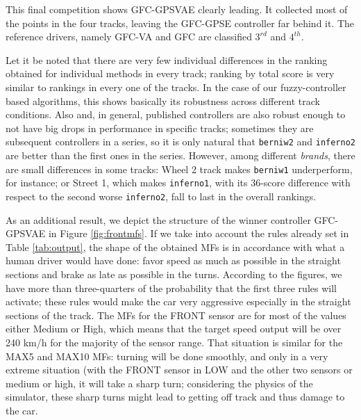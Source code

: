\documentclass[10pt,journal,compsoc]{IEEEtran}
\begin{document}
This final competition shows {\sf GFC-GPSVAE} clearly leading. It
collected most of the points in the four tracks, leaving the {\sf
  GFC-GPSE} controller far behind it. The reference drivers, namely
{\sf GFC-VA} and {\sf GFC}  are classified $3^{rd}$ and $4^{th}$.

Let it be noted that there are very few individual
  differences in the ranking obtained for individual methods in every
  track; ranking by total score is very similar to rankings in every
  one of the tracks. In the case of our fuzzy-controller based
  algorithms, this shows basically its robustness across different
  track conditions. Also and, in general, published controllers are also robust
  enough to not have big drops in performance in specific
  tracks; sometimes they are subsequent controllers in a series, so
  it is only natural that {\tt berniw2} and {\tt inferno2} are better
  than the first ones in the series. However, among different {\em
    brands}, there are small differences in some tracks: {\sf
    Wheel 2} track makes {\tt berniw1} underperform, for instance; or
  {\sf Street 1}, which makes {\tt inferno1}, with its 36-score
  difference with respect to the second worse {\tt inferno2}, fall to
  last in the overall rankings.


As an additional result, we depict the structure of the winner controller {\sf GFC-GPSVAE} in Figure \ref{fig:frontmfs}. 
If we take into account the rules already set in Table
\ref{tab:output}, the shape of the obtained MFs  is in accordance with
what a human driver would have done: favor speed as much as possible
in the straight sections and brake as late as possible in the turns. 
According to the figures, we have more than three-quarters of the probability that the first three rules will activate; these rules
would make the car very aggressive especially in the straight sections
of the track. The MFs for the FRONT sensor are for most of the values
either Medium or High, which means that the target speed output will
be over 240 km/h for the majority of the sensor range. 
That situation is similar for the MAX5 and MAX10 MFs: turning will be done smoothly, and only in a very extreme situation (with the FRONT sensor in LOW and
the other two sensors or medium or high, it will take a sharp turn;
considering the physics of the simulator, these sharp turns might lead
to getting off track and thus damage to the car.
\end{document}
